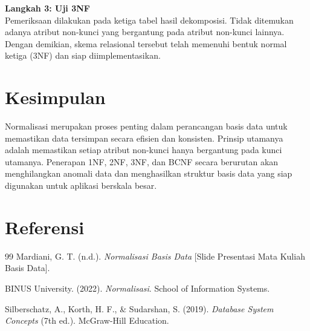 \documentclass[11pt,a4paper]{article}
\begin{document}
\textbf{Langkah 3: Uji 3NF} \\
Pemeriksaan dilakukan pada ketiga tabel hasil dekomposisi. Tidak ditemukan adanya atribut non-kunci yang bergantung pada atribut non-kunci lainnya. Dengan demikian, skema relasional tersebut telah memenuhi bentuk normal ketiga (3NF) dan siap diimplementasikan.

\section{Kesimpulan}

Normalisasi merupakan proses penting dalam perancangan basis data untuk memastikan data tersimpan secara efisien dan konsisten. Prinsip utamanya adalah memastikan setiap atribut non-kunci hanya bergantung pada kunci utamanya. Penerapan 1NF, 2NF, 3NF, dan BCNF secara berurutan akan menghilangkan anomali data dan menghasilkan struktur basis data yang siap digunakan untuk aplikasi berskala besar.

\newpage
\section*{Referensi}

\begin{thebibliography}{99}
	Mardiani, G. T. (n.d.). \textit{Normalisasi Basis Data} [Slide Presentasi Mata Kuliah Basis Data].

	BINUS University. (2022). \textit{Normalisasi}. School of Information Systems.

	Silberschatz, A., Korth, H. F., \& Sudarshan, S. (2019). \textit{Database System Concepts} (7th ed.). McGraw-Hill Education.
\end{thebibliography}
\end{document}
